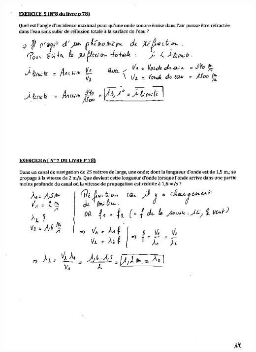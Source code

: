 \includegraphics[width=18.501cm,height=25.636cm]{Pictures/100000010000026D0000035CFF0F2F588EBA9209.png}

